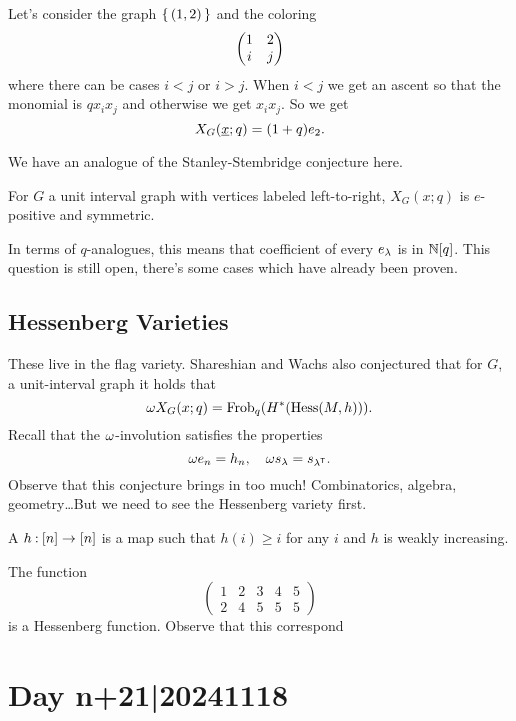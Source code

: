 \documentclass[12pt]{memoir}
\begin{document}
\begin{Ex}
    Let's consider the graph $\{\,(1,2)\,\}$ and the coloring 
    $$\begin{pmatrix} 1 & 2 \\ i & j \end{pmatrix}$$
    where there can be cases $i<j$ or $i>j$. When $i<j$ we get an ascent so that the monomial is $qx_ix_j$ and otherwise we get $x_ix_j$. So we get 
    $$X_G(\underline x;q)=(1+q)e_2.$$
\end{Ex}

We have an analogue of the Stanley-Stembridge conjecture here.

\begin{significant}
    For $G$ a unit interval graph with vertices labeled left-to-right, $X_G(x;q)$ is $e$-positive and symmetric. 
\end{significant}

In terms of $q$-analogues, this means that coefficient of every $e_\lambda$ is in $\mathbb{N}[q]$. This question is still open, there's some cases which have already been proven.

\subsection{Hessenberg Varieties}

These live in the flag variety. Shareshian and Wachs also conjectured that for $G$, a unit-interval graph it holds that 
$$\omega X_G(x;q)=\operatorname{Frob}_q(H^\ast(\operatorname{Hess}(M,h))).$$
Recall that the $\omega$-involution satisfies the properties 
$$\omega e_n=h_n,\quad \omega s_\lambda=s_{\lambda^{\mathsf{T}}}.$$
Observe that this conjecture brings in too much! Combinatorics, algebra, geometry\dots But we need to see the Hessenberg variety first.

\begin{Def}
    A  $h\mathbin{:}\left\lbrack n\right\rbrack\to\left\lbrack n\right\rbrack$ is a map such that $h(i)\geq i$ for any $i$ and $h$ is weakly increasing.
\end{Def}

\begin{Ex}
    The function
    $$\begin{pmatrix}
        1&2&3&4&5\\
        2&4&5&5&5
    \end{pmatrix}$$
    is a Hessenberg function. Observe that this correspond  
\end{Ex}

\section{Day n+21|20241118}
\end{document}
